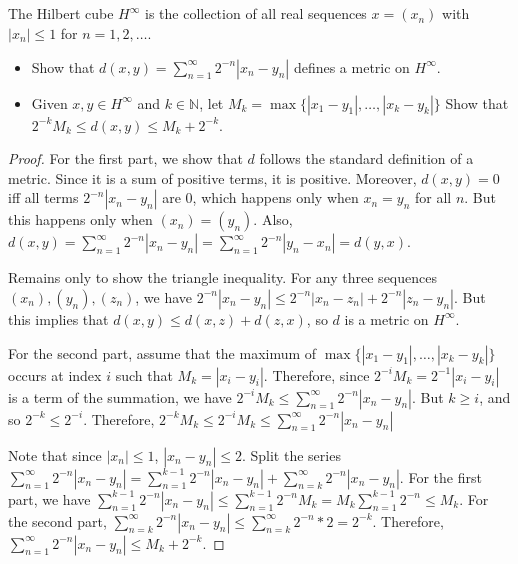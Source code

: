 
\subsection{} The Hilbert cube $H^\infty$ is the collection of all real sequences $x = (x_n)$ with $|x_n| \leq 1$ for $n = 1, 2, \dots$.
\begin{itemize}
    \item Show that $d(x, y) = \sum_{n=1}^\infty 2^{-n} |x_n - y_n|$ defines a metric on $H^\infty$.
    \item Given $x, y \in H^\infty$ and $k \in \mathbb{N}$, let $M_k = \max\{|x_1  - y_1|, \dots , |x_k - y_k|\}$ Show that $2^{-k} M_k \leq d(x, y) \leq M_k + 2^{-k}$. 
\end{itemize}

\begin{proof}
For the first part, we show that $d$ follows the standard definition of a metric. Since it is a sum of positive terms, it is positive. Moreover, $d(x,y) = 0$ iff all terms $2^{-n} |x_n - y_n|$ are 0, which happens only when $x_n = y_n$ for all $n$. But this happens only when $(x_n) = (y_n)$. Also, $d(x,y) = \sum_{n=1}^\infty 2^{-n} |x_n - y_n| = \sum_{n=1}^\infty 2^{-n} |y_n - x_n| = d(y,x)$.

Remains only to show the triangle inequality. For any three sequences $(x_n), (y_n), (z_n)$, we have $2^{-n}|x_n - y_n| \leq 2^{-n}|x_n - z_n| + 2^{-n}|z_n - y_n|$. But this implies that $d(x,y) \leq d(x,z) + d(z,x)$, so $d$ is a metric on $H^\infty$.

For the second part, assume that the maximum of $\max\{|x_1  - y_1|, \dots , |x_k - y_k|\}$ occurs at index $i$ such that $M_k = |x_i - y_i|$. Therefore, since $2^{-i} M_k = 2^{-1} |x_i - y_i|$ is a term of the summation, we have $2^{-i} M_k \leq \sum_{n=1}^\infty 2^{-n} |x_n - y_n|$. But $k \geq i$, and so $2^{-k} \leq 2^{-i}$. Therefore, $2^{-k} M_k \leq 2^{-i} M_k \leq \sum_{n=1}^\infty 2^{-n} |x_n - y_n|$

Note that since $|x_n| \leq 1$, $|x_n - y_n| \leq 2$. Split the series $\sum_{n=1}^\infty 2^{-n} |x_n - y_n| = \sum_{n=1}^{k-1} 2^{-n} |x_n - y_n| + \sum_{n=k}^\infty 2^{-n} |x_n - y_n|$. For the first part, we have $\sum_{n=1}^{k-1} 2^{-n} |x_n - y_n| \leq \sum_{n=1}^{k-1} 2^{-n} M_k = M_k \sum_{n=1}^{k-1} 2^{-n} \leq M_k$. For the second part, $\sum_{n=k}^\infty 2^{-n} |x_n - y_n| \leq \sum_{n=k}^\infty 2^{-n} * 2 = 2^{-k}$. Therefore, $\sum_{n=1}^\infty 2^{-n} |x_n - y_n| \leq M_k + 2^{-k}$.

\end{proof}


